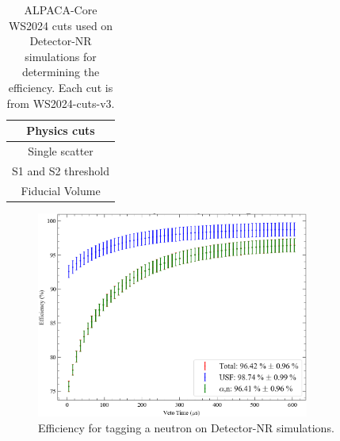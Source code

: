 \begin{table}[!ht]
	\centering
	\begin{tabular}{|c|}
    \hline
		\textbf{Physics cuts}        \\
		\hline
		Single scatter      \\
		S1 and S2 threshold \\
		Fiducial Volume\\
        \hline
	\end{tabular}
	\caption{ALPACA-Core WS2024 cuts used on Detector-NR simulations for determining the efficiency. Each cut is from WS2024-cuts-v3.}
	\label{tab:VetoEff/detector_nr_simulation_efficiency_cuts}
\end{table}

\begin{figure}[!ht]
	\centering
	\includegraphics[width=0.8\textwidth]{figures/VetoEfficiency/det_nr_efficiency.png}
	\caption{Efficiency for tagging a neutron on Detector-NR simulations.}
	\label{fig:VetoEff/detector_nr_efficiency}
\end{figure}

\clearpage
